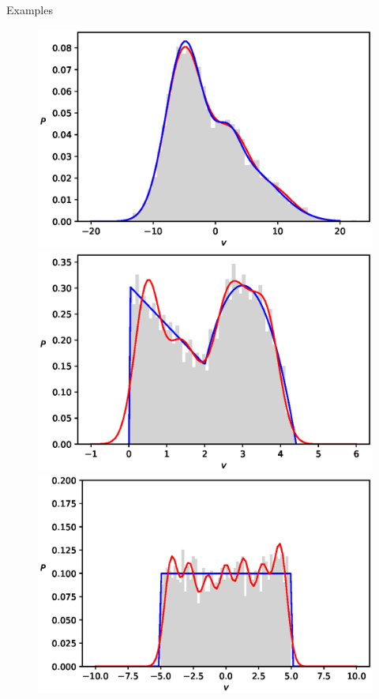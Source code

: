 \documentclass[10pt]{beamer}
\begin{document}
\begin{frame}{Examples}
\begin{figure}[t!]
\begin{center}
        \includegraphics[scale=0.30]{figures/Gaussians}    
        \includegraphics[scale=0.30]{figures/Likas2}  
        \includegraphics[scale=0.30]{figures/Likas1}


\end{center}
\end{figure}
\end{frame}
\end{document}
